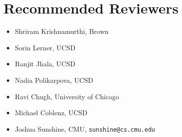 \section*{Recommended Reviewers}


\begin{itemize}
  \item Shriram Krishnamurthi, Brown
  \item Sorin Lerner, UCSD
  \item Ranjit Jhala, UCSD
  \item Nadia Polikarpova, UCSD
  \item Ravi Chugh, University of Chicago
  \item Michael Coblenz, UCSD
  \item Joshua Sunshine, CMU, {\tt sunshine@cs.cmu.edu}
\end{itemize}

\iflater
{}
\fi
